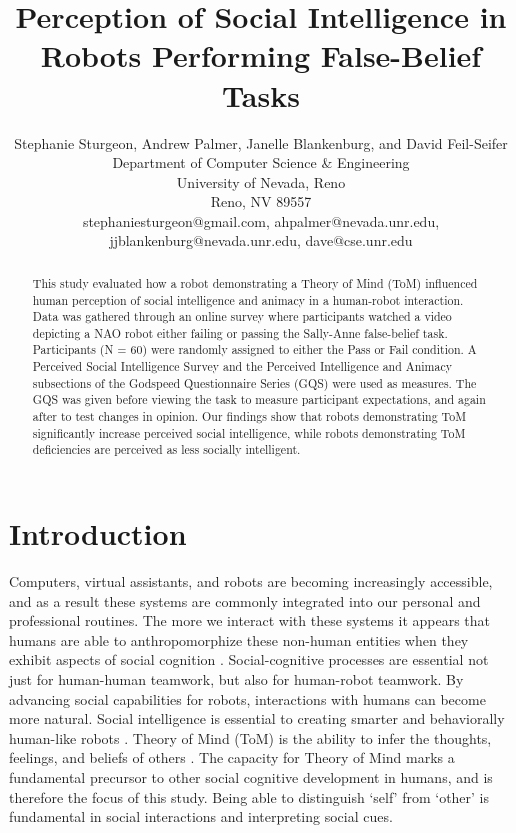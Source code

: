 \documentclass[letterpaper, 10 pt, conference]{ieeeconf}  %
\title{\LARGE \bf
Perception of Social Intelligence in Robots Performing False-Belief Tasks
}
\author{Stephanie Sturgeon, Andrew Palmer, Janelle Blankenburg, and David Feil-Seifer \\
Department of Computer Science \& Engineering \\
University of Nevada, Reno\\ Reno, NV 89557 \\
stephaniesturgeon@gmail.com, ahpalmer@nevada.unr.edu, jjblankenburg@nevada.unr.edu,
dave@cse.unr.edu
}
\begin{document}
\maketitle
\begin{abstract}
This study evaluated how a robot demonstrating a Theory of Mind (ToM) influenced human perception of social intelligence and animacy in a  human-robot interaction. Data was gathered through an online survey where participants watched a video depicting a NAO robot either failing or passing the Sally-Anne false-belief task. Participants (N = 60) were randomly assigned to either the Pass or Fail condition. A Perceived Social Intelligence Survey and the Perceived Intelligence and Animacy subsections of the Godspeed Questionnaire Series (GQS) were used as measures. The GQS was given before viewing the task to measure participant expectations, and again after to test changes in opinion. Our findings show that robots demonstrating ToM significantly increase perceived social intelligence, while robots demonstrating ToM deficiencies are perceived as less socially intelligent. 
\end{abstract}
\section{Introduction}
Computers, virtual assistants, and robots are becoming increasingly accessible, and as a result these systems are commonly integrated into our personal and professional routines. The more we interact with these systems it appears that humans are able to anthropomorphize these non-human entities when they exhibit aspects of social cognition \cite{VANDERWOERDT201993}\cite{Reeves}. Social-cognitive processes are essential not just for human-human teamwork, but also for human-robot teamwork. By advancing social capabilities for robots, interactions with humans can become more natural\cite{BREAZEAL2002481}. Social intelligence is essential to creating smarter and behaviorally human-like robots \cite{Dautenhahn94, dautenhahn98, dautenhahn2004}. Theory of Mind (ToM) is the ability to infer the thoughts, feelings, and beliefs of others \cite{BARONCOHEN85}. The capacity for Theory of Mind marks a fundamental precursor to other social cognitive development in humans, and is therefore the focus of this study. Being able to distinguish `self' from `other' is fundamental in social interactions and interpreting social cues.
\end{document}
